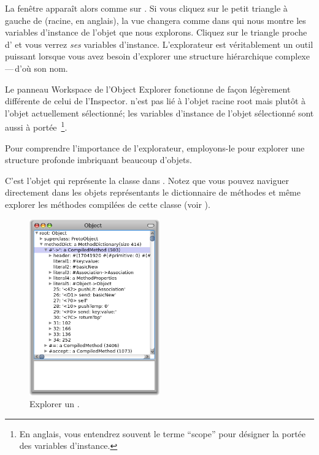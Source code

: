 \documentclass[a4paper,10pt,twoside]{book}
\begin{document}
La fenêtre  apparaît alors comme sur
 .
Si vous cliquez sur le petit triangle à gauche de  (racine, en anglais), 
la vue changera comme dans  qui
nous montre les variables d'instance de l'objet que nous explorons.
Cliquez sur le triangle proche d' et vous verrez
\emph{ses} variables d'instance.
L'explorateur est véritablement un outil puissant lorsque vous avez besoin
d'explorer une structure hiérarchique complexe\,---\,d'où son nom.

Le panneau Workspace de l'Object Explorer fonctionne de façon
 légèrement différente de celui de l'Inspector.
 n'est pas lié à l'objet racine root mais plutôt
à l'objet actuellement sélectionné; les variables d'instance de
l'objet sélectionné sont aussi à portée~\footnote{En anglais, vous
entendrez souvent le terme ``scope'' pour désigner la portée des
variables d'instance.}.

Pour comprendre l'importance de l'explorateur, employons-le pour
explorer une structure profonde imbriquant beaucoup d'objets.

C'est l'objet qui représente la classe   dans \pharo.
Notez que vous pouvez naviguer directement dans les objets
représentants le dictionnaire de méthodes et même explorer les
méthodes compilées de cette classe (voir ). %

\begin{figure}[tbp]
	\begin{center}
		\includegraphics[width=0.5\textwidth]{ExploreObject}
	\end{center}
	\caption{Explorer un .}
\end{figure}
\end{document}
